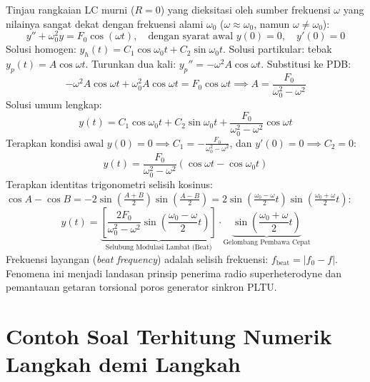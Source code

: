 \documentclass[11pt,a4paper]{article}
\theoremstyle{definition}
\begin{document}
Tinjau rangkaian LC murni ($R = 0$) yang dieksitasi oleh sumber frekuensi $\omega$ yang nilainya sangat dekat dengan frekuensi alami $\omega_0$ ($\omega \approx \omega_0$, namun $\omega \neq \omega_0$):
\begin{equation}
    y'' + \omega_0^2 y = F_0 \cos(\omega t), \quad \text{dengan syarat awal } y(0) = 0, \quad y'(0) = 0
\end{equation}
Solusi homogen: $y_h(t) = C_1 \cos\omega_0 t + C_2 \sin\omega_0 t$.
Solusi partikular: tebak $y_p(t) = A \cos\omega t$. Turunkan dua kali: $y_p'' = -\omega^2 A \cos\omega t$. Substitusi ke PDB:
\begin{equation}
    -\omega^2 A \cos\omega t + \omega_0^2 A \cos\omega t = F_0 \cos\omega t \implies A = \frac{F_0}{\omega_0^2 - \omega^2}
\end{equation}
Solusi umum lengkap:
\begin{equation}
    y(t) = C_1 \cos\omega_0 t + C_2 \sin\omega_0 t + \frac{F_0}{\omega_0^2 - \omega^2} \cos\omega t
\end{equation}
Terapkan kondisi awal $y(0) = 0 \implies C_1 = -\frac{F_0}{\omega_0^2 - \omega^2}$, dan $y'(0) = 0 \implies C_2 = 0$:
\begin{equation}
    y(t) = \frac{F_0}{\omega_0^2 - \omega^2} \left( \cos\omega t - \cos\omega_0 t \right)
\end{equation}
Terapkan identitas trigonometri selisih kosinus: $\cos A - \cos B = -2 \sin\left(\frac{A+B}{2}\right) \sin\left(\frac{A-B}{2}\right) = 2 \sin\left(\frac{\omega_0 - \omega}{2} t\right) \sin\left(\frac{\omega_0 + \omega}{2} t\right)$:
\begin{equation}
    y(t) = \underbrace{\left[ \frac{2 F_0}{\omega_0^2 - \omega^2} \sin\left(\frac{\omega_0 - \omega}{2} t\right) \right]}_{\text{Selubung Modulasi Lambat (Beat)}} \cdot \underbrace{\sin\left(\frac{\omega_0 + \omega}{2} t\right)}_{\text{Gelombang Pembawa Cepat}}
    \label{eq:beat_phenomenon}
\end{equation}
Frekuensi layangan (\textit{beat frequency}) adalah selisih frekuensi: $f_{\text{beat}} = |f_0 - f|$. Fenomena ini menjadi landasan prinsip penerima radio superheterodyne dan pemantauan getaran torsional poros generator sinkron PLTU.

\section{Contoh Soal Terhitung Numerik Langkah demi Langkah}
\end{document}
